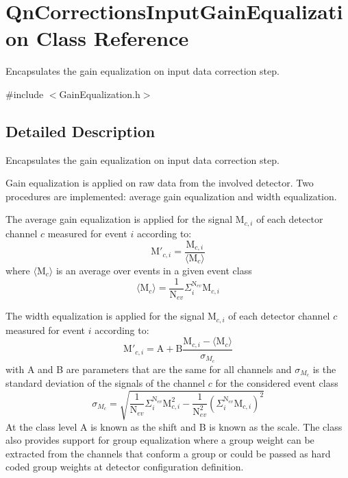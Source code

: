 \hypertarget{classQnCorrectionsInputGainEqualization}{}\section{Qn\+Corrections\+Input\+Gain\+Equalization Class Reference}
\label{classQnCorrectionsInputGainEqualization}


Encapsulates the gain equalization on input data correction step.  




{\ttfamily \#include $<$Gain\+Equalization.\+h$>$}



\subsection{Detailed Description}
Encapsulates the gain equalization on input data correction step. 

Gain equalization is applied on raw data from the involved detector. Two procedures are implemented\+: average gain equalization and width equalization.

The average gain equalization is applied for the signal $ \mbox{M}_{c,i} $ of each detector channel $ c $ measured for event $ i $ according to\+: \[ \mbox{M}'_{c,i} = \frac{\mbox{M}_{c,i}}{\langle\mbox{M}_{c}\rangle} \] where $\langle\mbox{M}_{c}\rangle$ is an average over events in a given event class \[ \langle\mbox{M}_{c}\rangle = \frac{1}{\mbox{N}_{ev}} \Sigma_{i}^{\mbox{N}_{ev}} \mbox{M}_{c,i} \]

The width equalization is applied for the signal $ \mbox{M}_{c,i} $ of each detector channel $ c $ measured for event $ i $ according to\+: \[ \mbox{M}'_{c,i} = \mbox{A} + \mbox{B} \frac{\mbox{M}_{c,i} - \langle\mbox{M}_{c}\rangle} {\sigma_{{M}_{c}}} \] with A and B are parameters that are the same for all channels and $\sigma_{{M}_{c}}$ is the standard deviation of the signals of the channel $c$ for the considered event class \[ \sigma_{{M}_{c}} = \sqrt{ \frac{1}{\mbox{N}_{ev}} \Sigma_{i}^{\mbox{N}_{ev}} \mbox{M}^2_{c,i} - \frac{1}{\mbox{N}^2_{ev}} \left(\Sigma_{i}^{\mbox{N}_{ev}} \mbox{M}_{c,i}\right)^2} \] At the class level A is known as the shift and B is known as the scale. The class also provides support for group equalization where a group weight can be extracted from the channels that conform a group or could be passed as hard coded group weights at detector configuration definition.

